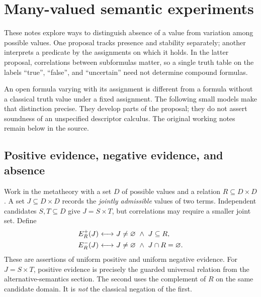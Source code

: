 \def\topic{many--valued}

\section{Many-valued semantic experiments}
These notes explore ways to distinguish absence of a value from variation
among possible values. One proposal tracks presence and stability
separately; another interprets a predicate by the assignments on which it
holds. In the latter proposal, correlations between subformulas matter,
so a single truth table on the labels ``true'', ``false'', and ``uncertain''
need not determine compound formulas.

An open formula varying with its assignment is different from a formula
without a classical truth value under a fixed assignment. The following
small models make that distinction precise. They develop parts of the
proposal; they do not assert soundness of an unspecified descriptor
calculus. The original working notes remain below in the source.

\subsection{Positive evidence, negative evidence, and absence}
Work in the metatheory with a set $D$ of possible values and a relation
$R\subseteq D\times D$. A set $J\subseteq D\times D$ records the
\emph{jointly admissible} values of two terms. Independent candidates
$S,T\subseteq D$ give $J=S\times T$, but correlations may require a
smaller joint set. Define
\[
\begin{split}
E_R^+(J)&{\ \longleftrightarrow\ } J\neq\varnothing\ \land\ J\subseteq R,\\
E_R^-(J)&{\ \longleftrightarrow\ } J\neq\varnothing\ \land\ J\cap R=\varnothing.
\end{split}
\]
These are assertions of uniform positive and uniform negative evidence.
For $J=S\times T$, positive evidence is precisely the guarded universal relation
from the alternative-semantics section. The second uses the complement
of $R$ on the same candidate domain. It is \emph{not} the classical
negation of the first.

